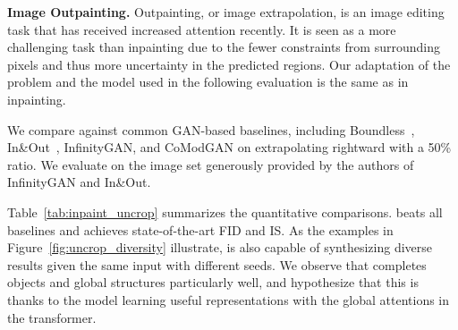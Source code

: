 \vspace{2mm}
\noindent\textbf{Image Outpainting.}
\label{ssec:outpainting}
Outpainting, or image extrapolation, is an image editing task that has received increased attention recently. It is seen as a more challenging task than inpainting due to the fewer constraints from surrounding pixels and thus more uncertainty in the predicted regions. Our adaptation of the problem and the model used in the following evaluation is the same as in inpainting.

We compare against common GAN-based baselines, including Boundless~\cite{teterwak2019boundless}, In\&Out~\cite{cheng2021inout}, InfinityGAN\cite{lin2021infinitygan}, and CoModGAN\cite{zhao2021comodgan} on extrapolating rightward with a 50\% ratio. We evaluate on the image set generously provided by the authors of InfinityGAN\cite{lin2021infinitygan} and In\&Out\cite{cheng2021inout}.

Table~\ref{tab:inpaint_uncrop} summarizes the quantitative comparisons. \model beats all baselines and achieves state-of-the-art FID and IS. As the examples in Figure~\ref{fig:uncrop_diversity} illustrate, \model is also capable of synthesizing diverse results given the same input with different seeds. We observe that \model completes objects and global structures particularly well, and hypothesize that this is thanks to the model learning useful representations with the global attentions in the transformer.

